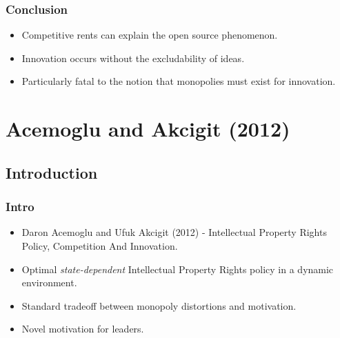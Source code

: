 \documentclass{beamer}
\begin{document}
\begin{frame}[t]\frametitle{Conclusion}
  \vspace{20mm}
  \begin{itemize}
  \item<+-> Competitive rents can explain the open source phenomenon.
  \vspace{2mm}
  \item<+-> Innovation occurs without the excludability of ideas.
  \vspace{2mm}
  \item<+-> Particularly fatal to the notion that monopolies must exist for innovation.
  \end{itemize}
\end{frame}
\section{Acemoglu and Akcigit (2012)}
\label{sec:acemoglu_and_akcigit_2012}

\subsection{Introduction}
\label{sub:introduction}

\begin{frame}[t]\frametitle{Intro}
  \begin{itemize}
	  \vspace{2mm}
    \item<+-> Daron Acemoglu and Ufuk Akcigit (2012) - Intellectual Property Rights Policy, Competition And Innovation.
	\vspace{2mm}
    \item<+-> Optimal \emph{state-dependent} Intellectual Property Rights policy in a dynamic environment.
	\vspace{2mm}
    \item<+-> Standard tradeoff between monopoly distortions and motivation.
	\vspace{2mm}
    \item<+-> Novel motivation for leaders.
  \end{itemize}
\end{frame}
\end{document}
